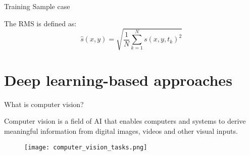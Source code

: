 \documentclass[10pt,aspectratio=169,dvipsnames]{beamer} %
\begin{document}
\setcounter{subfigure}{0}
\begin{frame}{Training Sample case}
	\begin{figure}
		\centering
		\qquad
		\qquad
	\end{figure}

The RMS is defined as:
\begin{equation*}
	\hat{s}(x,y) = \sqrt{\frac{1}{N}\sum_{k=1}^{N}s(x,y,t_k)^2} 
	\label{eqn:rms} 
\end{equation*}
\end{frame}
\section{Deep learning-based approaches}
\setcounter{subfigure}{0}
\begin{frame}{What is computer vision?}
	\begin{minipage}[c]{0.30\textwidth}
		Computer vision is a field of AI that enables computers and systems to derive meaningful information from digital images, videos and other visual inputs. 
	\end{minipage}
	\hfill
	\begin{minipage}[c]{0.65\textwidth}
		\begin{figure}
			\centering
			\texttt{[image: computer\_vision\_tasks.png]}
		\end{figure}
	\end{minipage}
\end{frame}
\end{document}
